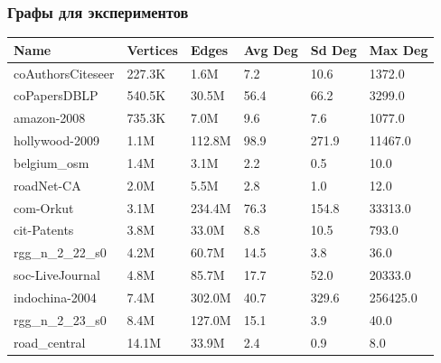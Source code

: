\documentclass[xcolor=table,aspectratio=169]{beamer}
\begin{document}
\begin{frame}[t]
  \frametitle{Графы для экспериментов}
  \begin{center}
    \begin{table}[]
      \begin{tabular}{l|l|l|l|l|l}
      Name              & Vertices & Edges  & Avg Deg & Sd Deg & Max Deg  \\
      \hline\hline
      \rowcolor{Gray}
      coAuthorsCiteseer & 227.3K   & 1.6M   & 7.2     & 10.6   & 1372.0   \\
      coPapersDBLP      & 540.5K   & 30.5M  & 56.4    & 66.2   & 3299.0   \\
      \rowcolor{Gray}
      amazon-2008       & 735.3K   & 7.0M   & 9.6     & 7.6    & 1077.0   \\
      hollywood-2009    & 1.1M     & 112.8M & 98.9    & 271.9  & 11467.0  \\
      \rowcolor{Gray}
      belgium\_osm      & 1.4M     & 3.1M   & 2.2     & 0.5    & 10.0     \\
      roadNet-CA        & 2.0M     & 5.5M   & 2.8     & 1.0    & 12.0     \\
      \rowcolor{Gray}
      com-Orkut         & 3.1M     & 234.4M & 76.3    & 154.8  & 33313.0  \\
      cit-Patents       & 3.8M     & 33.0M  & 8.8     & 10.5   & 793.0    \\
      \rowcolor{Gray}
      rgg\_n\_2\_22\_s0 & 4.2M     & 60.7M  & 14.5    & 3.8    & 36.0     \\
      soc-LiveJournal   & 4.8M     & 85.7M  & 17.7    & 52.0   & 20333.0  \\
      \rowcolor{Gray}
      indochina-2004    & 7.4M     & 302.0M & 40.7    & 329.6  & 256425.0 \\
      rgg\_n\_2\_23\_s0 & 8.4M     & 127.0M & 15.1    & 3.9    & 40.0     \\
      \rowcolor{Gray}
      road\_central     & 14.1M    & 33.9M  & 2.4     & 0.9    & 8.0     
      \end{tabular}
    \end{table}
  \end{center}
\end{frame}
\end{document}

